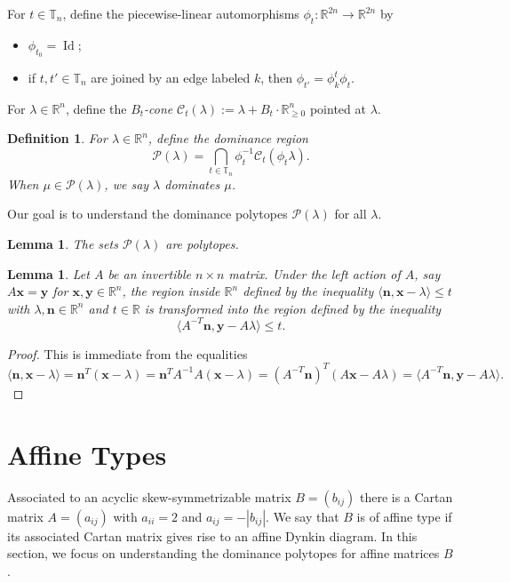 \documentclass{amsart}
\newtheorem{definition}[theorem]{Definition}
\newtheorem{lemma}[theorem]{Lemma}
\numberwithin{theorem}{section}
\newcommand{\bfn}{\boldsymbol{n}}
\newcommand{\bfx}{\boldsymbol{x}}
\newcommand{\bfy}{\boldsymbol{y}}
\newcommand{\cC}{\mathcal{C}}
\newcommand{\cP}{\mathcal{P}}
\newcommand{\RR}{\mathbb{R}}
\newcommand{\TT}{\mathbb{T}}
\newcommand{\Id}{\operatorname{Id}}
\begin{document}
  For $t\in\TT_n$, define the piecewise-linear automorphisms $\phi_t:\RR^{2n}\to\RR^{2n}$ by
  \begin{itemize}
    \item $\phi_{t_0}=\Id$;
    \item if $t,t'\in\TT_n$ are joined by an edge labeled $k$, then $\phi_{t'}=\phi^t_k \phi_t$.
  \end{itemize}

  
  For $\lambda\in\RR^n$, define the \emph{$B_t$-cone} $\cC_t(\lambda):=\lambda+B_t\cdot\RR_{\ge0}^n$ pointed at $\lambda$.
  \begin{definition}
    For $\lambda\in\RR^n$, define the \emph{dominance region} 
    \[ \cP(\lambda) = \bigcap_{t\in\TT_n} \phi_t^{-1} \cC_t(\phi_t \lambda). \]
    When $\mu\in\cP(\lambda)$, we say \emph{$\lambda$ dominates $\mu$}.
  \end{definition}
  Our goal is to understand the dominance polytopes $\cP(\lambda)$ for all $\lambda$.
  \begin{lemma}
    The sets $\cP(\lambda)$ are polytopes.
  \end{lemma}


  \begin{lemma}
    \label{le:transformed inequalities}
    Let $A$ be an invertible $n\times n$ matrix.
    Under the left action of $A$, say $A\bfx=\bfy$ for $\bfx,\bfy\in\RR^n$, the region inside $\RR^n$ defined by the inequality $\langle\bfn,\bfx-\lambda\rangle\le t$ with $\lambda,\bfn\in\RR^n$ and $t\in\RR$ is transformed into the region defined by the inequality \[\langle A^{-T}\bfn,\bfy-A\lambda\rangle\le t.\]
  \end{lemma}
  \begin{proof}
    This is immediate from the equalities
    \[\langle\bfn,\bfx-\lambda\rangle=\bfn^T(\bfx-\lambda)=\bfn^TA^{-1}A(\bfx-\lambda)=(A^{-T}\bfn)^T(A\bfx-A\lambda)=\langle A^{-T}\bfn,\bfy-A\lambda\rangle.\]
  \end{proof}


  \section{Affine Types}
  Associated to an acyclic skew-symmetrizable matrix $B=(b_{ij})$ there is a Cartan matrix $A=(a_{ij})$ with $a_{ii}=2$ and $a_{ij}=-|b_{ij}|$.
  We say that $B$ is of affine type if its associated Cartan matrix gives rise to an affine Dynkin diagram.
  In this section, we focus on understanding the dominance polytopes for affine matrices $B$.
\end{document}
